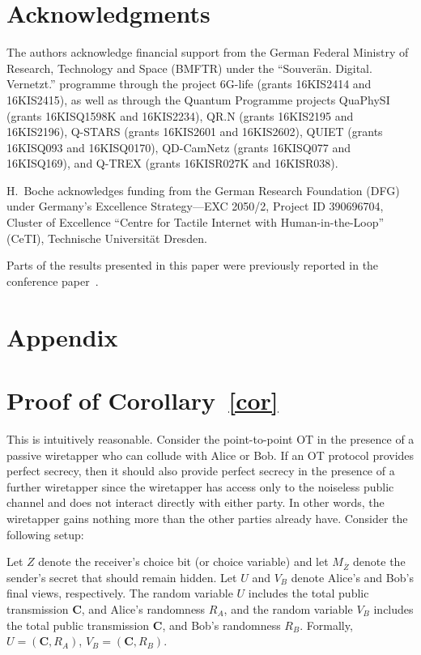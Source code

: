 \documentclass[runningheads]{llncs}
\newcommand{\parbreak}{ \vspace{0.3 em}}
\newcounter{protocol}
\begin{document}
\section*{Acknowledgments}
\begin{sloppy}
   
The authors acknowledge financial support from the German Federal Ministry of Research, Technology and Space (BMFTR) under the ``Souverän. Digital. Vernetzt.'' programme through the project 6G-life (grants 16KIS2414 and 16KIS2415), as well as through the Quantum Programme projects QuaPhySI (grants 16KISQ1598K and 16KIS2234), QR.N (grants 16KIS2195 and 16KIS2196), Q-STARS (grants 16KIS2601 and 16KIS2602), QUIET (grants 16KISQ093 and 16KISQ0170), QD-CamNetz (grants 16KISQ077 and 16KISQ169), and Q-TREX (grants 16KISR027K and 16KISR038).
 
\end{sloppy}
H.~Boche acknowledges funding from the German Research Foundation (DFG) under Germany's Excellence Strategy—EXC 2050/2, Project ID 390696704, Cluster of Excellence ``Centre for Tactile Internet with Human-in-the-Loop'' (CeTI), Technische Universität Dresden.

Parts of the results presented in this paper were previously reported in the conference paper~\cite{Hadi-ICC26}.



\clearpage
\section*{Appendix}
\appendix
\renewcommand{\thesection}{Appendix~\Alph{section}}
\renewcommand{\theHsection}{appendix.\Alph{section}}

\section{Proof of Corollary~\ref{cor}}
\label{app: cor}

This is intuitively reasonable. Consider the point-to-point OT in the presence of a passive wiretapper who can collude with Alice or Bob. If an OT protocol provides perfect secrecy, then it should also provide perfect secrecy in the presence of a further wiretapper since the wiretapper has access only to the noiseless public channel and does not interact directly with either party. In other words, the wiretapper gains nothing more than the other parties already have. Consider the following setup:

\parbreak Let $Z$ denote the receiver's choice bit (or choice variable) and let $M_{\overline{Z}}$ denote the sender's secret that should remain hidden.   
Let $U$ and $V_B$ denote Alice's and Bob's final views, respectively.  
The random variable $U$ includes the total public transmission $\mathbf{C}$, and Alice's randomness $R_A$, and the random variable $V_B$ includes the total public transmission $\mathbf{C}$, and Bob's randomness $R_B$.   
Formally, $U = (\mathbf{C},R_A)$, $V_B = (\mathbf{C},R_B)$. 
\end{document}
